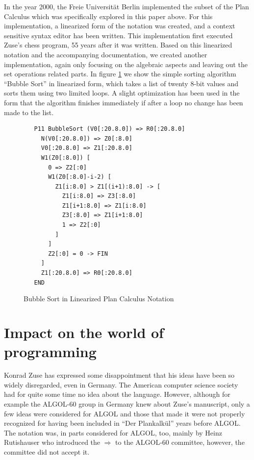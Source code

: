 \documentclass{llncs}
\begin{document}
 In the year 2000, the Freie Universität Berlin implemented the subset of the Plan Calculus which was specifically 
 explored in this paper above\cite{rojas2002plankalkuel}. For this implementation, a linearized form of the notation was created, and 
 a context sensitive syntax editor has been written. This implementation first executed Zuse's chess program, 
 55 years after it was written. Based on this linearized notation and the accompanying documentation, 
 we created another implementation, again only focusing on the algebraic aspects and leaving out the 
 set operations related parts. In figure \ref{fig:bubblesort} we show the simple sorting algorithm ``Bubble Sort'' in linearized form, 
 which takes a list of twenty 8-bit values and sorts them using two limited loops. A slight optimization has
 been used in the form that the algorithm finishes immediately if after a loop no change has been made
 to the list.
 \begin{figure}[tb]
   \begin{lstlisting}
   P11 BubbleSort (V0[:20.8.0]) => R0[:20.8.0]
     N(V0[:20.8.0]) => Z0[:8.0]
     V0[:20.8.0] => Z1[:20.8.0]
     W1(Z0[:8.0]) [
       0 => Z2[:0]
       W1(Z0[:8.0]-i-2) [
         Z1[i:8.0] > Z1[(i+1):8.0] -> [
           Z1[i:8.0] => Z3[:8.0]
           Z1[i+1:8.0] => Z1[i:8.0]
           Z3[:8.0] => Z1[i+1:8.0]
           1 => Z2[:0]
         ]
       ]
       Z2[:0] = 0 -> FIN
     ]
     Z1[:20.8.0] => R0[:20.8.0]
   END
   \end{lstlisting}
   \caption{Bubble Sort in Linearized Plan Calculus Notation}
   \label{fig:bubblesort}
 \end{figure}

 \section{Impact on the world of programming}
   Konrad Zuse has expressed some disappointment that his ideas have
   been so widely disregarded, even in Germany\cite{giloi2002konrad}. 
   The American computer science society had for quite some time 
   no idea about the language. However, although 
   for example the ALGOL-60 group in Germany knew about Zuse's manuscript, 
   only a few ideas were considered for ALGOL and those that made it 
   were not properly recognized for having been included in ``Der Plankalkül''
   years before ALGOL\cite{giloi2002konrad}. The notation was, in parts considered 
   for ALGOL, too, mainly by Heinz Rutishauser who introduced the $\Rightarrow$ 
   to the ALGOL-60 committee, however, the committee did not accept it\cite{epegmagHorstzuse}.
\end{document}
